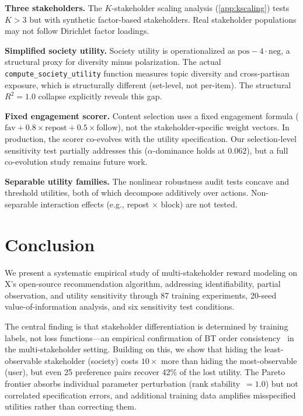 \documentclass[11pt,letterpaper]{article}
\begin{document}
\textbf{Three stakeholders.} The $K$-stakeholder scaling analysis (\cref{app:kscaling}) tests $K > 3$ but with
synthetic factor-based stakeholders. Real stakeholder populations may
not follow Dirichlet factor loadings.

\textbf{Simplified society utility.} Society utility is operationalized
as $\text{pos} - 4 \cdot \text{neg}$, a structural proxy for
diversity minus polarization. The actual \texttt{compute\_society\_utility}
function measures topic diversity and cross-partisan exposure, which is
structurally different (set-level, not per-item). The structural $R^2 = 1.0$
collapse explicitly reveals this gap.

\textbf{Fixed engagement scorer.} Content selection uses a fixed
engagement formula ($\text{fav} + 0.8 \times \text{repost} + 0.5
\times \text{follow}$), not the stakeholder-specific weight vectors.
In production, the scorer co-evolves with the utility specification.
Our selection-level sensitivity test partially addresses this
($\alpha$-dominance holds at $0.062$), but a full co-evolution study
remains future work.

\textbf{Separable utility families.} The nonlinear robustness audit
tests concave and threshold utilities, both of which decompose
additively over actions. Non-separable interaction effects (e.g.,
repost $\times$ block) are not tested.

\section{Conclusion}
\label{sec:conclusion}

We present a systematic empirical study of multi-stakeholder reward
modeling on X's open-source recommendation algorithm, addressing
identifiability, partial observation, and utility sensitivity through
87 training experiments, 20-seed value-of-information analysis, and
six sensitivity test conditions.

The central finding is that stakeholder differentiation is determined
by training labels, not loss functions---an empirical confirmation of
BT order consistency~\cite{sun2025rethinking} in the multi-stakeholder
setting. Building on this, we show that hiding the least-observable
stakeholder (society) costs $10\times$ more than hiding the
most-observable (user), but even 25 preference pairs recover 42\% of
the lost utility. The Pareto frontier absorbs individual parameter
perturbation (rank stability~$= 1.0$) but not correlated
specification errors, and additional training data amplifies
misspecified utilities rather than correcting them.
\end{document}
